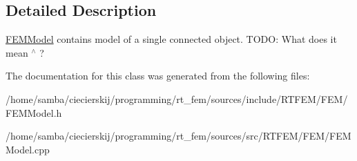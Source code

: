 \subsection{Detailed Description}
\hyperlink{classrtfem_1_1FEMModel}{F\+E\+M\+Model} contains model of a single connected object. T\+O\+DO\+: What does it mean $^\wedge$ ? 

The documentation for this class was generated from the following files\+:\begin{DoxyCompactItemize}
\item 
/home/samba/ciecierskij/programming/rt\+\_\+fem/sources/include/\+R\+T\+F\+E\+M/\+F\+E\+M/F\+E\+M\+Model.\+h\item 
/home/samba/ciecierskij/programming/rt\+\_\+fem/sources/src/\+R\+T\+F\+E\+M/\+F\+E\+M/F\+E\+M\+Model.\+cpp\end{DoxyCompactItemize}
